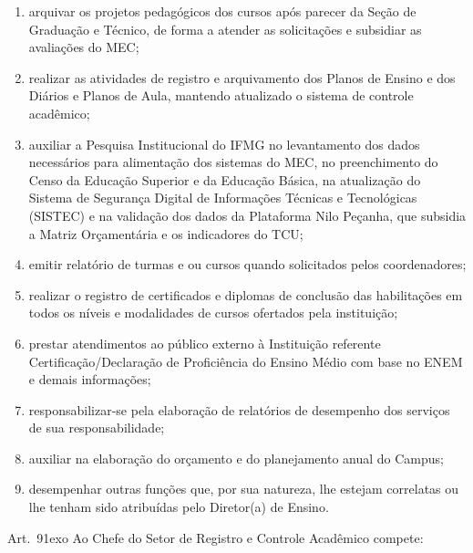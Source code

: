 \documentclass[a4paper,12pt]{report}
\newcommand{\ORD}[2]{#1\raise1ex\hbox{\scriptsize#2}}
\begin{document}
\begin{enumerate}
\item arquivar os projetos pedagógicos dos cursos após parecer da Seção de Graduação e 
      Técnico, de forma a atender as solicitações e subsidiar as avaliações do MEC;

\item realizar as atividades de registro e arquivamento dos Planos de Ensino e dos Diários 
      e Planos de Aula, mantendo atualizado o sistema de controle acadêmico;

\item auxiliar a Pesquisa Institucional do IFMG no levantamento dos dados necessários para 
      alimentação dos sistemas do MEC, no preenchimento do Censo da Educação Superior e da Educação Básica, na atualização do Sistema de Segurança Digital de Informações Técnicas e Tecnológicas (SISTEC) e na validação dos dados da Plataforma Nilo Peçanha, que subsidia a Matriz Orçamentária e os indicadores do TCU;

\item emitir relatório de turmas e ou cursos quando solicitados pelos coordenadores;

\item realizar o registro de certificados e diplomas de conclusão das habilitações em todos       os níveis e modalidades de cursos ofertados pela instituição;

\item prestar atendimentos ao público externo à Instituição referente 
      Certificação/Declaração de Proficiência do Ensino Médio com base no ENEM e demais informações;

\item responsabilizar-se pela elaboração de relatórios de desempenho dos serviços de sua   
      responsabilidade;

\item auxiliar na elaboração do orçamento e do planejamento anual do Campus;

\item desempenhar outras funções que, por sua natureza, lhe estejam correlatas ou lhe   
      tenham sido atribuídas pelo Diretor(a) de Ensino.
\end{enumerate}


Art.~\ORD{9}{o} Ao Chefe do Setor de Registro e Controle Acadêmico compete:
\end{document}
